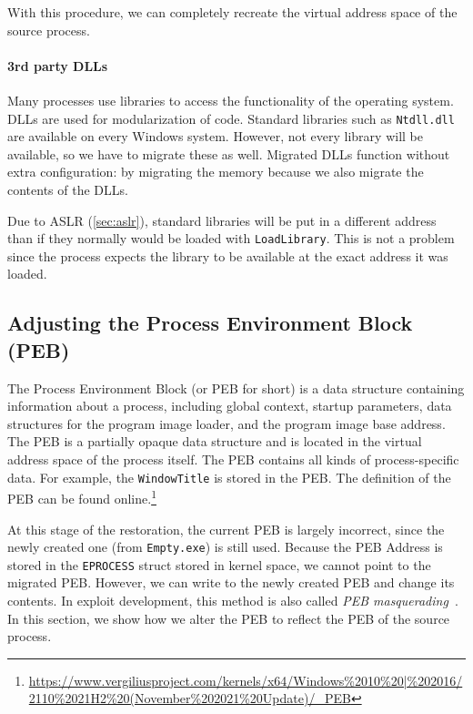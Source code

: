 \documentclass[a4paper, 11pt, english]{report}
\begin{document}
With this procedure, we can completely recreate the virtual address space of the source process.

\paragraph{3rd party DLLs}
\label{sec:implementation-dlls}
Many processes use libraries to access the functionality of the operating system. DLLs are used for modularization of code. Standard libraries such as \texttt{Ntdll.dll} are available on every Windows system. However, not every library will be available, so we have to migrate these as well. Migrated DLLs function without extra configuration: by migrating the memory because we also migrate the contents of the DLLs. 

Due to ASLR (\autoref{sec:aslr}), standard libraries will be put in a different address than if they normally would be loaded with \texttt{LoadLibrary}. This is not a problem since the process expects the library to be available at the exact address it was loaded.

\subsection{Adjusting the Process Environment Block (PEB)}
\label{sec:PEB}
The Process Environment Block (or PEB for short) is a data structure containing information about a process, including global context, startup parameters, data structures for the program image loader, and the program image base address. The PEB is a partially opaque data structure and is located in the virtual address space of the process itself. 
The PEB contains all kinds of process-specific data. For example, the \texttt{WindowTitle} is stored in the PEB. The definition of the PEB can be found online.\footnote{\url{https://www.vergiliusproject.com/kernels/x64/Windows\%2010\%20|\%202016/2110\%2021H2\%20(November\%202021\%20Update)/\_PEB}}

At this stage of the restoration, the current PEB is largely incorrect, since the newly created one (from \texttt{Empty.exe}) is still used.
Because the PEB Address is stored in the \texttt{EPROCESS} struct stored in kernel space, we cannot point to the migrated PEB. However, we can write to the newly created PEB and change its contents. In exploit development, this method is also called \textit{PEB masquerading}~\cite{peb-masquerading}. In this section, we show how we alter the PEB to reflect the PEB of the source process.
\end{document}

